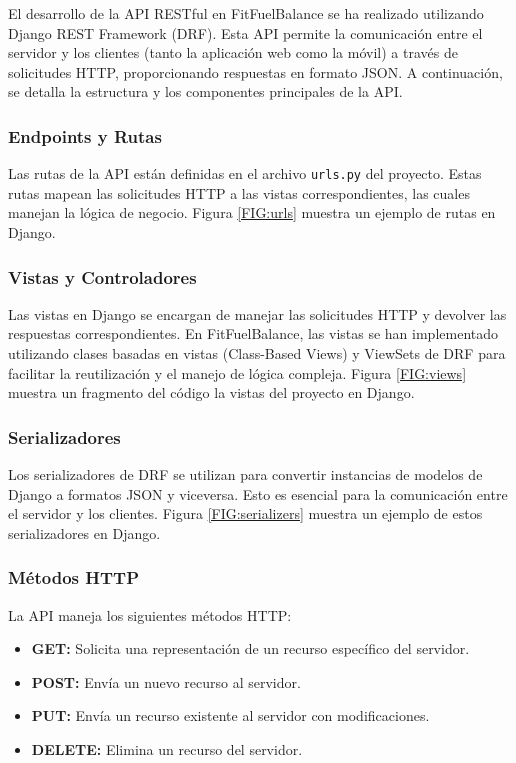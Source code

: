 El desarrollo de la API RESTful en FitFuelBalance se ha realizado utilizando Django REST Framework (DRF). Esta API permite la comunicación entre el servidor y los clientes (tanto la aplicación web como la móvil) a través de solicitudes HTTP, proporcionando respuestas en formato JSON. A continuación, se detalla la estructura y los componentes principales de la API.

\subsubsection{Endpoints y Rutas}
Las rutas de la API están definidas en el archivo \texttt{urls.py} del proyecto. Estas rutas mapean las solicitudes HTTP a las vistas correspondientes, las cuales manejan la lógica de negocio. Figura \ref{FIG:urls} muestra un ejemplo de rutas en Django.



\subsubsection{Vistas y Controladores}
Las vistas en Django se encargan de manejar las solicitudes HTTP y devolver las respuestas correspondientes. En FitFuelBalance, las vistas se han implementado utilizando clases basadas en vistas (Class-Based Views) y ViewSets de DRF para facilitar la reutilización y el manejo de lógica compleja. Figura \ref{FIG:views} muestra un fragmento del código la vistas del proyecto en Django.

\subsubsection{Serializadores}
Los serializadores de DRF se utilizan para convertir instancias de modelos de Django a formatos JSON y viceversa. Esto es esencial para la comunicación entre el servidor y los clientes. Figura \ref{FIG:serializers} muestra un ejemplo de estos serializadores en Django.

\subsubsection{Métodos HTTP}
La API maneja los siguientes métodos HTTP:
\begin{itemize}
    \item \textbf{GET:} Solicita una representación de un recurso específico del servidor.
    \item \textbf{POST:} Envía un nuevo recurso al servidor.
    \item \textbf{PUT:} Envía un recurso existente al servidor con modificaciones.
    \item \textbf{DELETE:} Elimina un recurso del servidor.
\end{itemize}

